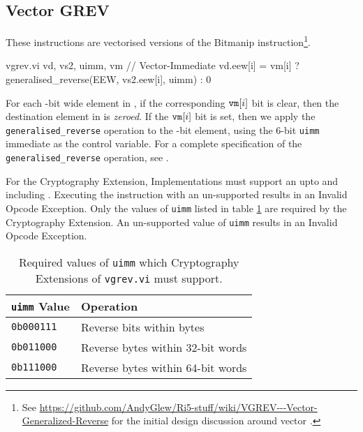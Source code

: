 
\subsection{Vector GREV}

These instructions are vectorised versions of the Bitmanip
 instruction\footnote{
See \url{https://github.com/AndyGlew/Ri5-stuff/wiki/VGREV---Vector-Generalized-Reverse}
for the initial design discussion around vector .
}.

\begin{cryptoisa}
vgrev.vi     vd, vs2, uimm, vm  // Vector-Immediate
    vd.eew[i] = vm[i] ? generalised_reverse(EEW, vs2.eew[i], uimm) : 0
\end{cryptoisa}

For each \EEW-bit wide element in , if the corresponding ${\tt vm}[i]$
bit is clear, then the destination element in \vrd is {\em zeroed}.
If the ${\tt vm}[i]$ bit is set, then we apply the
\texttt{generalised\_reverse} operation to the \EEW-bit element, using the
$6$-bit \texttt{uimm} immediate as the control variable.
For a complete specification of the \texttt{generalised\_reverse}
operation, see 
\cite[Section 2.2.2, Generalized Reverse]{riscv:bitmanip:draft}.

For the Cryptography Extension,
Implementations must support an \EEW upto and including \XLEN.
Executing the instruction with an un-supported \EEW results in an
Invalid Opcode Exception.
Only the values of \texttt{uimm} listed in table \ref{tab:vgrev:uimm}
are required by the Cryptography Extension.
An un-supported value of \texttt{uimm} results in an
Invalid Opcode Exception.

\begin{table}
\centering
\begin{tabular}{ll}
\texttt{uimm} Value & Operation                         \\
\hline
\texttt{0b000111}   & Reverse bits within bytes         \\
\texttt{0b011000}   & Reverse bytes within 32-bit words \\
\texttt{0b111000}   & Reverse bytes within 64-bit words \\
\hline
\end{tabular}
\caption{Required values of \texttt{uimm} which Cryptography Extensions
of \texttt{vgrev.vi} must support.}
\label{tab:vgrev:uimm}
\end{table}
